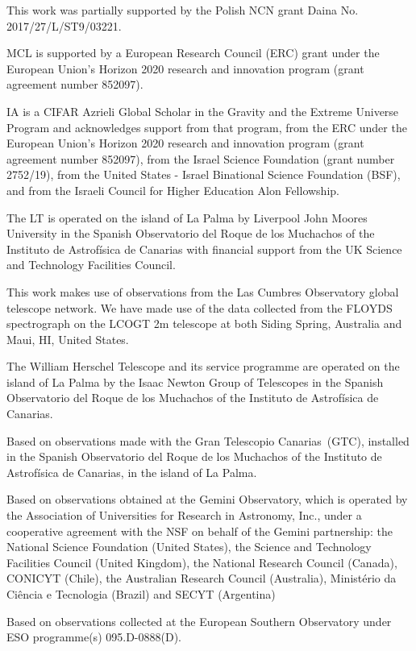 \documentclass[linenumbers, twocolumn]{aastex631}
\begin{document}
This work was partially supported by the Polish NCN grant Daina
No. 2017/27/L/ST9/03221.

MCL is supported by a European Research Council (ERC) grant under the European Union's Horizon 2020 research and innovation program (grant agreement number 852097).

IA is a CIFAR Azrieli Global Scholar in the Gravity and the Extreme Universe Program and acknowledges support from that program, from the ERC under the European Union's Horizon 2020 research and innovation program (grant agreement number 852097), from the Israel Science Foundation (grant number 2752/19), from the United States - Israel Binational Science Foundation (BSF), and from the Israeli Council for Higher Education Alon Fellowship.

The LT is operated on the island of La Palma by Liverpool
John Moores University in the Spanish Observatorio del Roque
de los Muchachos of the Instituto de Astrof{\'i}sica de Canarias with
financial support from the UK Science and Technology Facilities
Council.

This work makes use of observations from the Las Cumbres Observatory
global telescope network. We have made use of the data collected from
the FLOYDS spectrograph on the LCOGT 2m telescope at both Siding Spring,
Australia and Maui, HI, United States.

The William Herschel Telescope and its service programme are operated
on the island of La Palma by the Isaac Newton Group of Telescopes in
the Spanish Observatorio del Roque de los Muchachos of the Instituto
de Astrof\'isica de Canarias.

Based on observations made with the Gran Telescopio Canarias~(GTC), installed 
in the Spanish Observatorio del Roque de los Muchachos of the Instituto de 
Astrof\'isica de Canarias, in the island of La Palma.

Based on observations obtained at the Gemini Observatory, which is operated by the
Association of Universities for Research in Astronomy, Inc., under a cooperative agreement
with the NSF on behalf of the Gemini partnership: the National Science Foundation (United
States), the Science and Technology Facilities Council (United Kingdom), the
National Research Council (Canada), CONICYT (Chile), the Australian Research Council
(Australia), Ministério da Ciência e Tecnologia (Brazil) and SECYT (Argentina)

Based on observations collected at the European Southern Observatory under ESO programme(s) 095.D-0888(D).
\end{document}

